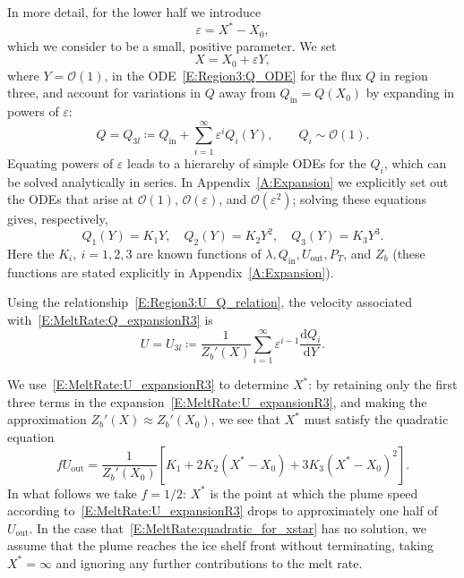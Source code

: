 \documentclass[openacc]{rsproca_new}%
\newcommand{\dd}[2]{\frac{\mathrm{d} #1}{\mathrm{d} #2}}
\newcommand{\order}[1]{\mathcal{O}(#1)}
\newcommand{\Pt}{\textit{P}_T}
\renewcommand{\in}{\text{in}} %
\newcommand{\out}{\text{out}}
\begin{document}
In more detail, for the lower half we introduce 
\begin{equation}
\varepsilon = X^* - X_0,
\end{equation}
which we consider to be a small, positive parameter. We set 
\begin{equation}
X = X_0 + \varepsilon Y,
\end{equation}
where  $Y = \order{1}$, in the ODE~\eqref{E:Region3:Q_ODE} for the flux $Q$ in region three, and account for variations in $Q$ away from $Q_{\text{in}} = Q(X_0)$ by expanding in powers of $\varepsilon$:
\begin{equation}\label{E:MeltRate:Q_expansionR3}
Q = Q_{3l} \coloneqq   Q_\in  + \sum_{i = 1}^{\infty} \varepsilon^i Q_i(Y), \qquad Q_i \sim \order{1}.
 \end{equation}
Equating powers of $\varepsilon$ leads to a hierarchy of simple ODEs for the $Q_i$, which can be solved analytically in series. In Appendix~\ref{A:Expansion} we explicitly set out the ODEs that arise at $\order{1}$, $\order{\varepsilon}$, and $\order{\varepsilon^2}$; solving these equations gives, respectively,
\begin{equation}
Q_1(Y) = K_1 Y, \quad Q_2(Y) = K_2 Y^2, \quad Q_3(Y) =K_3 Y^3.
\end{equation}
Here the $K_i,~i = 1,2,3$ are known functions of $\lambda, Q_\in, U_\out, \Pt$, and $Z_b$ (these functions are stated explicitly in Appendix~\ref{A:Expansion}). 

Using the relationship~\eqref{E:Region3:U_Q_relation}, the velocity associated with~\eqref{E:MeltRate:Q_expansionR3} is
 \begin{equation}\label{E:MeltRate:U_expansionR3}
U = U_{3l} \coloneqq \frac{1}{Z_b'(X)} \sum_{i = 1}^{\infty} \varepsilon^{i-1} \dd{Q_i}{Y}.
\end{equation}

We use~\eqref{E:MeltRate:U_expansionR3} to determine $X^*$: by retaining only the first three terms in the expansion~\eqref{E:MeltRate:U_expansionR3}, and making the approximation  $Z_b'(X) \approx Z_b'(X_0)$, we see that $X^*$ must satisfy the quadratic equation
\begin{equation}\label{E:MeltRate:quadratic_for_xstar}
f U_\out = \frac{1}{Z_b'(X_0)}\left[K_1 + 2 K_2(X^* - X_0) + 3K_3(X^* - X_0)^2 \right].
\end{equation}
In what follows we take $f = 1/2$: $X^*$ is the point at which the plume speed according to~\eqref{E:MeltRate:U_expansionR3} drops to approximately one half of $U_\out$. In the case that~\eqref{E:MeltRate:quadratic_for_xstar} has no solution, we assume that the plume reaches the ice shelf front without terminating, taking $X^* = \infty$ and ignoring any further contributions to the melt rate.
\end{document}
